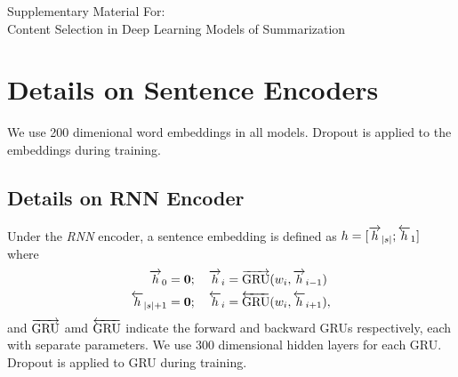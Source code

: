 \begin{centering}
  \Large
  Supplementary Material For:\\
  Content Selection in Deep Learning Models of Summarization\\

\end{centering}

  \section{Details on Sentence Encoders} \label{app:sentencoders}

  We use 200 dimenional word embeddings \wordEmb[i] in all models.
  Dropout is applied to the embeddings during training.

\subsection{Details on RNN Encoder} \label{app:rnnencoder}
  
Under the \textit{RNN} encoder, a sentence embedding is defined as
$\sentEmb = [\rSentEmb[\sentSize]; \lSentEmb[1]]$
where 
\begin{align} 
  \rSentEmb[0] = \mathbf{0} &;\quad 
       \rSentEmb[i] = \rgru(\wordEmb[i], \rSentEmb[i-1]) \\
  \lSentEmb[\sentSize + 1] = \mathbf{0} &;\quad 
       \lSentEmb[i] = \lgru(\wordEmb[i], \lSentEmb[i+1]),
\end{align}
and $\overrightarrow{\operatorname{GRU}}$ amd $\overleftarrow{\operatorname{GRU}}$ indicate the 
forward and backward GRUs respectively, each with separate 
parameters. We use 300 dimensional hidden layers for each GRU. 
Dropout is applied to GRU during training.

